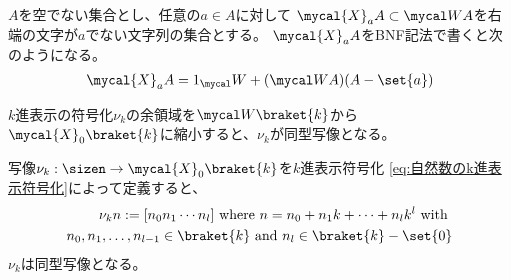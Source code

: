 	\begin{definition}[数を表す文字列]\label{def:数を表す文字列} %
		$A$を空でない集合とし、任意の$a\in A$に対して
		$\mycal{X}_aA\subset\Word A$を右端の文字が$a$でない文字列の集合とする。
		$\mycal{X}_aA$をBNF記法で書くと次のようになる。
		\begin{equation*}\begin{split}
			\mycal{X}_aA = 1_\Word + (\Word A)(A - \set{a})
		\end{split}\end{equation*}
	\end{definition} %

	$k$進表示の符号化$\nu_k$の余領域を$\Word\braket{k}$から
	$\mycal{X}_0\braket{k}$に縮小すると、$\nu_k$が同型写像となる。

	\begin{proposition}[同型写像となるk進表示]
	\label{prop:同型写像となるk進表示} %
		写像$\nu_k:\sizen\to\mycal{X}_0\braket{k}$を$k$進表示符号化
		\eqref{eq:自然数のk進表示符号化}によって定義すると、
		\begin{equation*}\begin{split}
			\nu_k n := [n_0n_1\cdots n_l] \text{ where }
			n = n_0 + n_1k + \cdots + n_lk^l \text{ with } \\
			n_0,n_1,\dots,n_{l-1}\in\braket{k} \text{ and } n_l\in\braket{k} - \set{0}
		\end{split}\end{equation*}
		$\nu_k$は同型写像となる。
	\end{proposition} %

